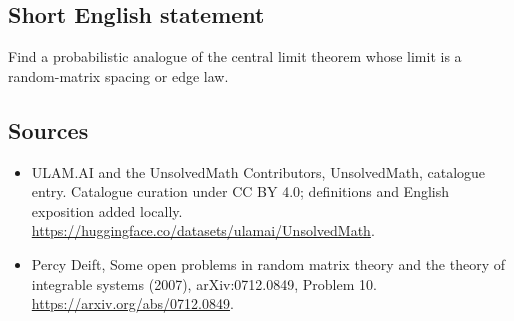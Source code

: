\documentclass[11pt]{article}
\begin{document}
\subsection{Short English statement}
Find a probabilistic analogue of the central limit theorem whose limit is a random-matrix spacing or edge law.
\subsection{Sources}
\begin{itemize}
\item[\hypertarget{source:statement:1}{S1}] ULAM.AI and the UnsolvedMath Contributors, UnsolvedMath, catalogue entry. Catalogue curation under CC BY 4.0; definitions and English exposition added locally.
\url{https://huggingface.co/datasets/ulamai/UnsolvedMath}.
\item[\hypertarget{source:statement:2}{S2}] Percy Deift, Some open problems in random matrix theory and the theory of integrable systems (2007), arXiv:0712.0849, Problem 10.
\url{https://arxiv.org/abs/0712.0849}.
\end{itemize}
\label{end:statement}
\end{document}

